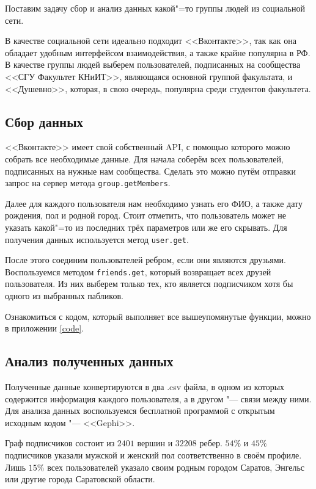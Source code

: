 Поставим задачу сбор и анализ данных какой"=то группы людей из социальной сети.

В качестве социальной сети идеально подходит <<Вконтакте>>, так как она обладает удобным интерфейсом взаимодействия, а также крайне популярна в РФ. В качестве группы людей выберем  пользователей, подписанных на сообщества <<СГУ Факультет КНиИТ>>, являющаяся основной группой факультата, и <<Душевно>>, которая, в свою очередь, популярна среди студентов факультета.

\subsection{Сбор данных}
<<Вконтакте>> имеет свой собственный API\cite{vk}, с помощью которого можно собрать все необходимые данные. Для начала соберём всех пользователей, подписанных на нужные нам сообщества. Сделать это можно путём отправки запрос на сервер метода \texttt{group.getMembers}. 

Далее для каждого пользователя нам необходимо узнать его ФИО, а также дату рождения, пол и родной город. Стоит отметить, что пользователь может не указать какой"=то из последних трёх параметров или же его скрывать. Для получения данных используется метод \texttt{user.get}. 

После этого соединим пользователей ребром, если они являются друзьями. Воспользуемся методом \texttt{friends.get}, который возвращает всех друзей пользователя. Из них выберем только тех, кто является подписчиком хотя бы одного из выбранных пабликов.

Ознакомиться с кодом, который выполняет все вышеупомянутые функции, можно в приложении \ref{code}.

\subsection{Анализ полученных данных}
Полученные данные конвертируются в два .csv файла, в одном из которых содержится информация каждого пользователя, а в другом "--- связи между ними. Для анализа данных воспользуемся бесплатной программой с открытым исходным кодом "--- <<Gephi>>.

Граф подписчиков состоит из $2401$ вершин и $32208$ ребер.
$54\%$ и $45\%$ подписчиков указали мужской и женский пол соответственно в своём профиле. Лишь $15\%$ всех пользователей указало своим родным городом Саратов, Энгельс или другие города Саратовской области.

